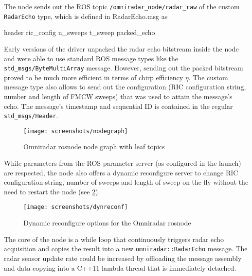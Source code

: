 The node sends out the ROS topic \texttt{/omniradar\_node/radar\_raw} of
the custom \texttt{RadarEcho} type, which is defined in RadarEcho.msg as

\begin{Shaded}
\begin{Highlighting}[]
 header
 ric_config
 n_sweeps
 t_sweep
 packed_echo
\end{Highlighting}
\end{Shaded}


Early versions of the driver unpacked the radar echo bitstream inside
the node and were able to use standard ROS message types like the
\texttt{std\_msgs/ByteMultiArray} message. However, sending out the
packed bitstream proved to be much more efficient in terms of chirp
efficiency \(\eta\). The custom message type also allows to send out the
configuration (RIC configuration string, number and length of FMCW
sweeps) that was used to attain the message's echo. The message's
timestamp and sequential ID is contained in the regular
\texttt{std\_msgs/Header}.

\begin{figure}[htbp]
    \centering
    \texttt{[image: screenshots/nodegraph]}
    \caption{Omniradar rosnode node graph with leaf topics}
    \label{fig:nodegraph}
\end{figure}

While parameters from the ROS parameter server (as configured in the
launch) are respected, the node also offers a dynamic reconfigure server
to change RIC configuration string, number of sweeps and length of sweep
on the fly without the need to restart the node (see \cref{fig:dynreconf}).

\begin{figure}[htbp]
    \centering
    \texttt{[image: screenshots/dynreconf]}
    \caption{Dynamic reconfigure options for the Omniradar rosnode}
    \label{fig:dynreconf}
\end{figure}

The core of the node is a while loop that continuously triggers radar
echo acquisition and copies the result into a new
\texttt{omniradar::RadarEcho} message. The radar sensor update rate
could be increased by offloading the message assembly and data copying
into a C++11 lambda thread that is immediately detached.

